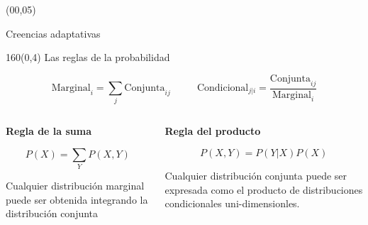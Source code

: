 \documentclass[shownotes,aspectratio=169]{beamer}
\begin{document}
\color{black!85}
\large
 


\begin{frame}
 
 \begin{textblock}{90}(00,05)
\begin{center}
 \huge  \textcolor{black!66}{Creencias adaptativas}
\end{center}
\end{textblock}

{}
\end{frame}



\begin{frame}[plain]
\begin{textblock}{160}(0,4)
\centering \Large Las reglas de la probabilidad
\end{textblock}


\vspace{0.75cm}



\begin{equation*}
  \text{Marginal}_{i} = \sum_j \text{Conjunta}_{ij}  \ \ \ \ \ \ \ \ \ \ \ \  \text{Condicional}_{j|i} = \frac{\text{Conjunta}_{ij}}{\text{Marginal}_{i}}
\end{equation*}

\pause
\vspace{0.75cm}


\begin{columns}[t]
\begin{column}{0.5\textwidth}
 \centering \textbf{Regla de la suma}
 
 
\begin{equation*}
 P(X) = \sum_Y P(X,Y)
\end{equation*}
 
 \justifying \footnotesize
  Cualquier distribución marginal puede ser obtenida integrando la distribución conjunta

 \end{column}
 \begin{column}{0.5\textwidth}
\centering  \textbf{Regla del producto}

\begin{equation*}
 P(X,Y) = P(Y|X) P(X)
\end{equation*}

 \justifying \footnotesize
Cualquier distribución conjunta puede ser expresada como el producto de distribuciones condicionales uni-dimensionles.

\end{column}
\end{columns}

\end{frame}
\end{document}
